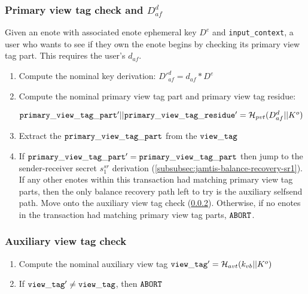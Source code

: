 \subsubsection{Primary view tag check and $D^d_{af}$}
\label{subsubsec:jamtis-balance-recovery-view-tag-primary}

Given an enote with associated enote ephemeral key $D^e$ and {\tt input\_context}, a user who wants to see if they own the enote begins by checking its primary view tag part. This requires the user's $d_{af}$.

\begin{enumerate}
    \item Compute the nominal key derivation: $D'^d_{af} = d_{af} * D^e$

    \item Compute the nominal primary view tag part and primary view tag residue:

    ${\tt primary\_view\_tag\_part'} || {\tt primary\_view\_tag\_residue'} = \mathcal{H}_{pvt}(D^d_{af} || K^o)$
    
    \item Extract the ${\tt primary\_view\_tag\_part}$ from the ${\tt view\_tag}$

    \item If ${\tt primary\_view\_tag\_part}' = {\tt primary\_view\_tag\_part}$ then jump to the sender-receiver secret $s^{sr}_1$ derivation (\ref{subsubsec:jamtis-balance-recovery-sr1}). If any other enotes within this transaction had matching primary view tag parts, then the only balance recovery path left to try is the auxiliary selfsend path. Move onto the auxiliary view tag check (\ref{subsubsec:jamtis-balance-recovery-aux-check}). Otherwise, if no enotes in the transaction had matching primary view tag parts, ${\tt ABORT}$.
\end{enumerate}

\subsubsection{Auxiliary view tag check}
\label{subsubsec:jamtis-balance-recovery-aux-check}

\begin{enumerate}
    \item Compute the nominal auxiliary view tag ${\tt view\_tag'} = \mathcal{H}_{avt}(k_{vb} || K^o)$
    
    \item If ${\tt view\_tag'} \neq {\tt view\_tag}$, then ${\tt ABORT}$
\end{enumerate}

